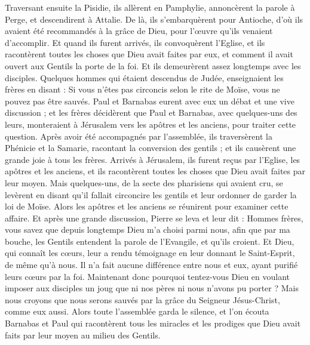 \begin{multicols}{2}
Traversant ensuite la Pisidie, ils allèrent en Pamphylie,
annoncèrent la parole à Perge, et descendirent à Attalie.
De là, ils s’embarquèrent pour Antioche, d'où ils avaient été recommandés à la grâce de Dieu, pour l’œuvre qu'ils venaient d’accomplir.
Et quand ils furent arrivés, ils convoquèrent l’Eglise, et ils racontèrent toutes les choses que Dieu avait faites par eux, et comment il avait ouvert aux Gentils la porte de la foi.
Et ils demeurèrent assez longtemps avec les disciples.
\VerseOne{}Quelques hommes qui étaient descendus de Judée, enseignaient les frères en disant : Si vous n'êtes pas circoncis selon le rite de Moïse, vous ne pouvez pas être sauvés.
Paul et Barnabas eurent avec eux un débat et une vive discussion ; et les frères décidèrent que Paul et Barnabas, avec quelques-uns des leurs, monteraient à Jérusalem vers les apôtres et les anciens, pour traiter cette question.
Après avoir été accompagnés par l’assemblée, ils traversèrent la Phénicie et la Samarie, racontant la conversion des gentils ; et ils causèrent une grande joie à tous les frères.
Arrivés à Jérusalem, ils furent reçus par l'Eglise, les apôtres et les anciens, et ils racontèrent toutes les choses que Dieu avait faites par leur moyen.
Mais quelques-uns, de la secte des pharisiens qui avaient cru, se levèrent en disant qu'il fallait circoncire les gentils et leur ordonner de garder la loi de Moïse.
Alors les apôtres et les anciens se réunirent pour examiner cette affaire.
Et après une grande discussion, Pierre se leva et leur dit : Hommes frères, vous savez que depuis longtemps Dieu m’a choisi parmi nous, afin que par ma bouche, les Gentils entendent la parole de l'Evangile, et qu'ils croient.
Et Dieu, qui connaît les cœurs, leur a rendu témoignage en leur donnant le Saint-Esprit, de même qu'à nous.
Il n'a fait aucune différence entre nous et eux, ayant purifié leurs cœurs par la foi.
Maintenant donc pourquoi tentez-vous Dieu en voulant imposer aux disciples un joug que ni nos pères ni nous n'avons pu porter ?
Mais nous croyons que nous serons sauvés par la grâce du Seigneur Jésus-Christ, comme eux aussi.
Alors toute l'assemblée garda le silence, et l’on écouta Barnabas et Paul qui racontèrent tous les miracles et les prodiges que Dieu avait faits par leur moyen au milieu des Gentils.

\end{multicols}
